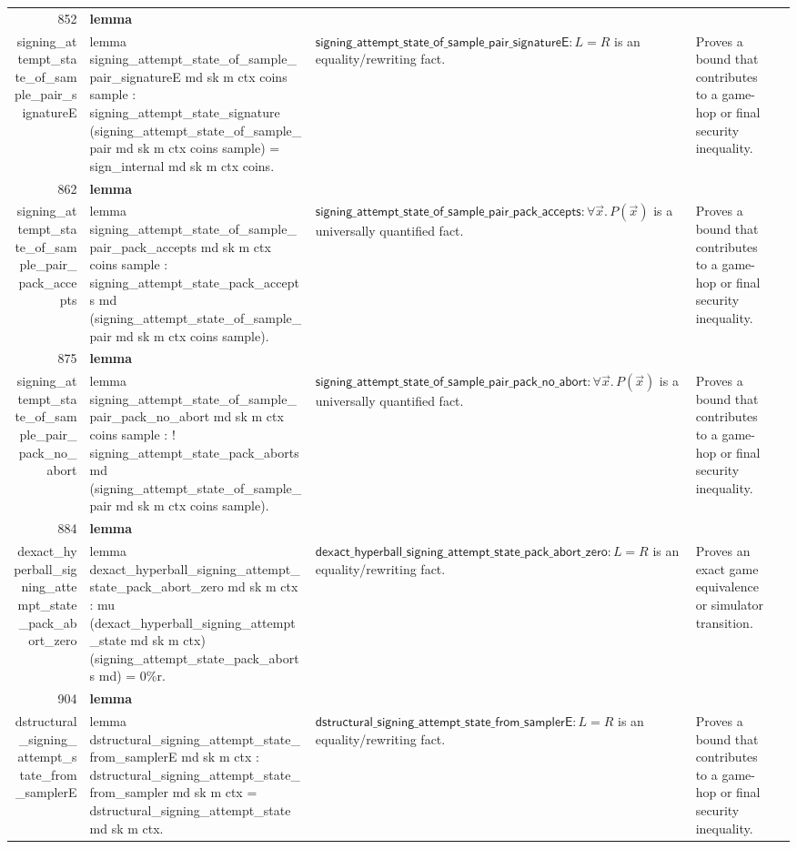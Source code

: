\documentclass[10pt]{article}
\newcommand{\ec}[1]{\begingroup\ttfamily\scriptsize #1\endgroup}
\begin{document}
\begin{longtable}{r L{0.17\textwidth} L{0.26\textwidth} L{0.27\textwidth} L{0.20\textwidth}}
852 & \textbf{lemma}\\\ec{signing\_attempt\_state\_of\_sample\_pair\_signatureE} & \ec{lemma signing\_attempt\_state\_of\_sample\_pair\_signatureE md sk m ctx coins sample : signing\_attempt\_state\_signature (signing\_attempt\_state\_of\_sample\_pair md sk m ctx coins sample) = sign\_internal md sk m ctx coins.} & \(\mathsf{signing\_attempt\_state\_of\_sample\_pair\_signatureE} : L = R\) is an equality/rewriting fact. & Proves a bound that contributes to a game-hop or final security inequality. \\
862 & \textbf{lemma}\\\ec{signing\_attempt\_state\_of\_sample\_pair\_pack\_accepts} & \ec{lemma signing\_attempt\_state\_of\_sample\_pair\_pack\_accepts md sk m ctx coins sample : signing\_attempt\_state\_pack\_accepts md (signing\_attempt\_state\_of\_sample\_pair md sk m ctx coins sample).} & \(\mathsf{signing\_attempt\_state\_of\_sample\_pair\_pack\_accepts} : \forall \vec{x}.\, P(\vec{x})\) is a universally quantified fact. & Proves a bound that contributes to a game-hop or final security inequality. \\
875 & \textbf{lemma}\\\ec{signing\_attempt\_state\_of\_sample\_pair\_pack\_no\_abort} & \ec{lemma signing\_attempt\_state\_of\_sample\_pair\_pack\_no\_abort md sk m ctx coins sample : ! signing\_attempt\_state\_pack\_aborts md (signing\_attempt\_state\_of\_sample\_pair md sk m ctx coins sample).} & \(\mathsf{signing\_attempt\_state\_of\_sample\_pair\_pack\_no\_abort} : \forall \vec{x}.\, P(\vec{x})\) is a universally quantified fact. & Proves a bound that contributes to a game-hop or final security inequality. \\
884 & \textbf{lemma}\\\ec{dexact\_hyperball\_signing\_attempt\_state\_pack\_abort\_zero} & \ec{lemma dexact\_hyperball\_signing\_attempt\_state\_pack\_abort\_zero md sk m ctx : mu (dexact\_hyperball\_signing\_attempt\_state md sk m ctx) (signing\_attempt\_state\_pack\_aborts md) = 0\%r.} & \(\mathsf{dexact\_hyperball\_signing\_attempt\_state\_pack\_abort\_zero} : L = R\) is an equality/rewriting fact. & Proves an exact game equivalence or simulator transition. \\
904 & \textbf{lemma}\\\ec{dstructural\_signing\_attempt\_state\_from\_samplerE} & \ec{lemma dstructural\_signing\_attempt\_state\_from\_samplerE md sk m ctx : dstructural\_signing\_attempt\_state\_from\_sampler md sk m ctx = dstructural\_signing\_attempt\_state md sk m ctx.} & \(\mathsf{dstructural\_signing\_attempt\_state\_from\_samplerE} : L = R\) is an equality/rewriting fact. & Proves a bound that contributes to a game-hop or final security inequality. \\

\end{longtable}
\end{document}

